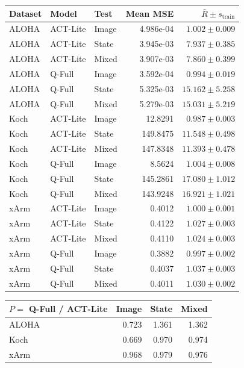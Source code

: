\documentclass[11pt,a4paper]{article}
\begin{document}
\begin{center}
\footnotesize
\begin{tabular}{lllrr}
\toprule
Dataset & Model & Test & Mean MSE & $\bar R\pm s_{\mathrm{train}}$ \\
\midrule
ALOHA & ACT-Lite & Image & 4.986e-04 & $1.002\pm0.009$ \\
ALOHA & ACT-Lite & State & 3.945e-03 & $7.937\pm0.385$ \\
ALOHA & ACT-Lite & Mixed & 3.907e-03 & $7.860\pm0.399$ \\
ALOHA & Q-Full & Image & 3.592e-04 & $0.994\pm0.019$ \\
ALOHA & Q-Full & State & 5.325e-03 & $15.162\pm5.258$ \\
ALOHA & Q-Full & Mixed & 5.279e-03 & $15.031\pm5.219$ \\
Koch & ACT-Lite & Image & 12.8291 & $0.987\pm0.003$ \\
Koch & ACT-Lite & State & 149.8475 & $11.548\pm0.498$ \\
Koch & ACT-Lite & Mixed & 147.8348 & $11.393\pm0.478$ \\
Koch & Q-Full & Image & 8.5624 & $1.004\pm0.008$ \\
Koch & Q-Full & State & 145.2861 & $17.080\pm1.012$ \\
Koch & Q-Full & Mixed & 143.9248 & $16.921\pm1.021$ \\
xArm & ACT-Lite & Image & 0.4012 & $1.000\pm0.001$ \\
xArm & ACT-Lite & State & 0.4122 & $1.027\pm0.003$ \\
xArm & ACT-Lite & Mixed & 0.4110 & $1.024\pm0.003$ \\
xArm & Q-Full & Image & 0.3882 & $0.997\pm0.002$ \\
xArm & Q-Full & State & 0.4037 & $1.037\pm0.003$ \\
xArm & Q-Full & Mixed & 0.4011 & $1.030\pm0.002$ \\
\bottomrule
\end{tabular}
\end{center}
\begin{center}
\footnotesize
\begin{tabular}{lrrr}
\toprule
$P=$ Q-Full / ACT-Lite & Image & State & Mixed \\
\midrule
ALOHA & 0.723 & 1.361 & 1.362 \\
Koch & 0.669 & 0.970 & 0.974 \\
xArm & 0.968 & 0.979 & 0.976 \\
\bottomrule
\end{tabular}
\end{center}
\end{document}
